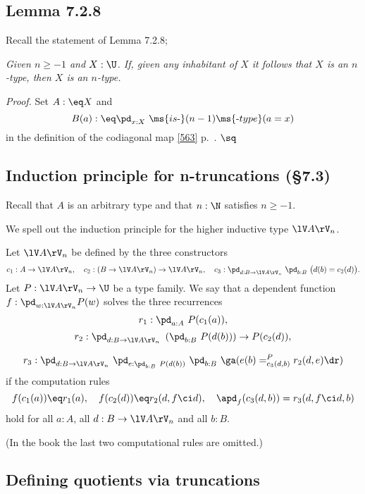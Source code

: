 \documentclass[12pt]{article}
\begin{document}

\subsection{Lemma 7.2.8}

Recall the statement of Lemma 7.2.8;

\nn\emph{Given $n\ge-1$ and $X:\U$. If, given any inhabitant of $X$ it follows that $X$ is an $n$-type, then $X$ is an $n$-type.}

\nn\emph{Proof.} Set $A:\eq X$ and 
$$
B(a):\eq\pd_{x:X}\ \ms{is\text-}(n-1)\ms{\text-type}(a=x)
$$ 
in the definition of the codiagonal map \eqref{563} p.~\pageref{563}. $\sq$



\subsection{Induction principle for n-truncations (\S7.3)}

Recall that $A$ is an arbitrary type and that $n:\N$ satisfies $n\ge-1$.

We spell out the induction principle for the higher inductive type $\lV A\rV_n$.

Let $\lV A\rV_n$ be defined by the three constructors 
$$
c_1:A\to \lV A\rV_n,\quad c_2:(B\to \lV A\rV_n)\to \lV A\rV_n,\quad c_3:\pd_{d:B\to \lV A\rV_n}\ \pd_{b:B}\ \big(d(b)=c_2(d)\big).
$$ 
Let $P:\lV A\rV_n\to\U$ be a type family. We say that a dependent function $f:\pd_{w:\lV A\rV_n}P(w)$ solves the three recurrences 
$$
r_1:\pd_{a:A}\ P(c_1(a)),
$$ 
$$
r_2:\pd_{d:B\to \lV A\rV_n}\ \left(\pd_{b:B}\ P(d(b))\right)\to P(c_2(d)),
$$

$$
r_3:\pd_{d:B\to \lV A\rV_n}\ \pd_{e:\pd_{b:B}\ P(d(b))}\ \pd_{b:B}\ \ga(e(b)=^P_{c_3(d,b)}r_2(d,e)\dr)
$$ 
if the computation rules
$$
f(c_1(a))\eq r_1(a),\quad f(c_2(d))\eq r_2(d,f\ci d),\quad\apd_f(c_3(d,b))=r_3(d,f\ci d,b)
$$ 
hold for all $a:A$, all $d:B\to \lV A\rV_n$ and all $b:B$. 

(In the book the last two computational rules are omitted.)


\subsection{Defining quotients via truncations}\label{qvt}
\end{document}
